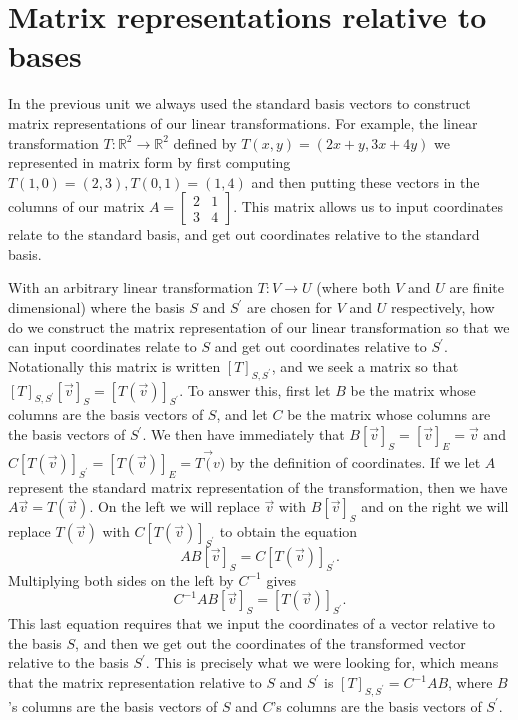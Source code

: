 \documentclass[10pt]{article}
\theoremstyle{plain}
\theoremstyle{box}
\begin{document}
\section{Matrix representations relative to bases}

In the previous unit we always used the standard basis vectors to construct matrix representations of our linear transformations.  For example, the linear transformation $T:{\mathbb{R}}^2 \to {\mathbb{R}}^2$ defined by $T(x,y)=(2x+y,3x+4y)$ we represented in matrix form by first computing $T(1,0)=(2,3), T(0,1)=(1,4)$ and then putting these vectors in the columns of our matrix 
$A=
\begin{bmatrix}
2&1\\
3&4
\end{bmatrix}
$. This matrix allows us to input coordinates relate to the standard basis, and get out coordinates relative to the standard basis.

With an arbitrary linear transformation $T:V \to U$ (where both $V$ and $U$ are finite dimensional) where the basis $S$ and $S^\prime$ are chosen for $V$ and $U$ respectively, how do we construct the matrix representation of our linear transformation so that we can input coordinates relate to $S$ and get out coordinates relative to $S^\prime$.  Notationally this matrix is written $[T]_{S,S^\prime}$, and we seek a matrix so that $[T]_{S,S^\prime}[\vec v]_S=[T(\vec v)]_{S^\prime}$. To answer this, first let $B$ be the matrix whose columns are the basis vectors of $S$, and let $C$ be the matrix whose columns are the basis vectors of $S^\prime$. We then have immediately that $B[\vec v]_S=[\vec v]_E=\vec v$ and $C[T(\vec v)]_{S^\prime}=[T(\vec v)]_E=T\vec (v)$ by the definition of coordinates. If we let $A$ represent the standard matrix representation of the transformation, then we have $A\vec v = T(\vec v)$.  On the left we will replace $\vec v$ with $B[\vec v]_S$ and on the right we will replace $T(\vec v)$ with $C[T(\vec v)]_{S^\prime}$ to obtain the equation 
$$AB[\vec v]_S=C[T(\vec v)]_{S^\prime}.$$
Multiplying both sides on the left by $C^{-1}$ gives $$C^{-1}AB[\vec v]_S=[T(\vec v)]_{S^\prime}.$$ This last equation requires that we input the coordinates of a vector relative to the basis $S$, and then we get out the coordinates of the transformed vector relative to the basis $S^\prime$. This is precisely what we were looking for, which means that the matrix representation relative to $S$ and $S^\prime$ is $[T]_{S,S^\prime} = C^{-1}AB$, where $B$'s columns are the basis vectors of $S$ and $C$'s columns are the basis vectors of $S^\prime$.
\end{document}
